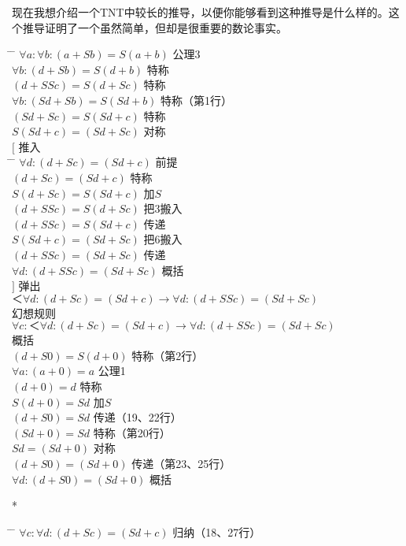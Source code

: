 现在我想介绍一个TNT中较长的推导，以便你能够看到这种推导是什么样的。这个推导证明了一个虽然简单，但却是很重要的数论事实。
\begin{tabbing*}
\indent\indent \= \tabindent{-2em} \= \+\kill
$\forall a:\forall b:(a+Sb)=S(a+b)$ \>公理3\\
$\forall b:(d+Sb)=S(d+b)$ \>特称\\
$(d+SSc)=S(d+Sc)$ \>特称\\
$\forall b:(Sd+Sb)=S(Sd+b)$ \>特称（第1行）\\
$(Sd+Sc)=S(Sd+c)$ \>特称\\
$S(Sd+c)=(Sd+Sc)$ \>对称\\
$[$ \>推入\\
\pushtabs
  \quad \= \tabindent{-1em} \= \+\kill
  $\forall d:(d+Sc)=(Sd+c)$ \>前提\\
  $(d+Sc)=(Sd+c)$ \>特称\\
  $S(d+Sc)=S(Sd+c)$ \>加$S$\\
  $(d+SSc)=S(d+Sc)$ \>把3搬入\\
  $(d+SSc)=S(Sd+c)$ \>传递\\
  $S(Sd+c)=(Sd+Sc)$ \>把6搬入\\
  $(d+SSc)=(Sd+Sc)$ \>传递\\
  $\forall d:(d+SSc)=(Sd+Sc)$ \>概括\-\\
\poptabs
$]$ \>弹出\\
$＜\forall d:(d+Sc)=(Sd+c)→\forall d:(d+SSc)=(Sd+Sc)$ \\
  \>幻想规则 \nonumber\\
$\forall c:＜\forall d:(d+Sc)=(Sd+c)→\forall d:(d+SSc)=(Sd+Sc)$ \\
  \>概括 \nonumber\\
$(d+S0)=S(d+0)$ \>特称（第2行）\\
$\forall a:(a+0)=a$ \>公理1\\
$(d+0)=d$ \>特称\\
$S(d+0)=Sd$ \>加$S$\\
$(d+S0)=Sd$ \>传递（19、22行）\\
$(Sd+0)=Sd$ \>特称（第20行）\\
$Sd=(Sd+0)$ \>对称\\
$(d+S0)=(Sd+0)$ \>传递（第23、25行）\\
$\forall d:(d+S0)=(Sd+0)$ \>概括
\end{tabbing*}
\begin{center}
* \quad * \quad * \quad * \quad *
\end{center}
\begin{tabbing*}[]
\indent\indent \= \tabindent{-2em} \= \+\kill
$\forall c:\forall d:(d+Sc)=(Sd+c)$ \>归纳（18、27行）
\end{tabbing*}
